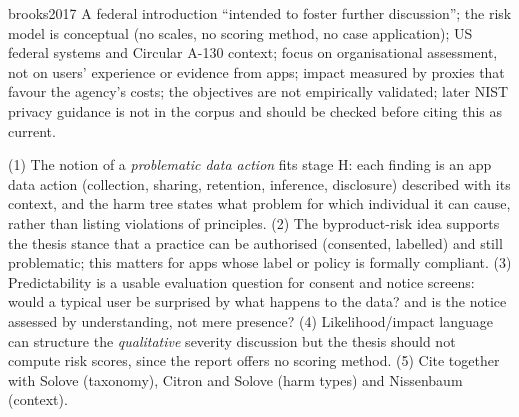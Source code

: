 \begin{papercard}{brooks2017}
 A federal introduction ``intended to foster further discussion''; the risk model is conceptual (no scales, no scoring method, no case application); US federal systems and Circular A-130 context; focus on organisational assessment, not on users' experience or evidence from apps; impact measured by proxies that favour the agency's costs; the objectives are not empirically validated; later NIST privacy guidance is not in the corpus and should be checked before citing this as current.

 (1) The notion of a \emph{problematic data action} fits stage H: each finding is an app data action (collection, sharing, retention, inference, disclosure) described with its context, and the harm tree states what problem for which individual it can cause, rather than listing violations of principles. (2) The byproduct-risk idea supports the thesis stance that a practice can be authorised (consented, labelled) and still problematic; this matters for apps whose label or policy is formally compliant. (3) Predictability is a usable evaluation question for consent and notice screens: would a typical user be surprised by what happens to the data? and is the notice assessed by understanding, not mere presence? (4) Likelihood/impact language can structure the \emph{qualitative} severity discussion but the thesis should not compute risk scores, since the report offers no scoring method. (5) Cite together with Solove (taxonomy), Citron and Solove (harm types) and Nissenbaum (context).
\end{papercard}
